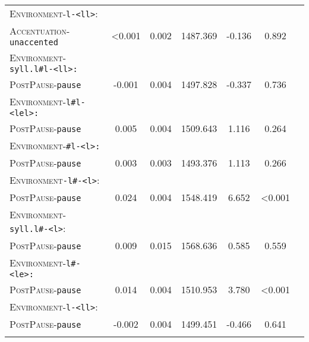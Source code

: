\begin{table}[H]
{\begin{tabular}{lSSSSSS}
		\textsc{Environment}-\texttt{l-<ll>}:&&&&&\\
		\textsc{Accentuation}-\texttt{unaccented} & \color{lsLightGray} <0.001 &\color{lsLightGray}  0.002 & \color{lsLightGray} 1487.369 &\color{lsLightGray}  -0.136 & \color{lsLightGray} 0.892 \\ 
		
		\textsc{Environment}-\texttt{syll.l\#l-<ll>:}&&&&&\\
		\textsc{PostPause}-\texttt{pause} &\color{lsLightGray}  -0.001 &\color{lsLightGray}  0.004 & \color{lsLightGray} 1497.828 &\color{lsLightGray}  -0.337 & \color{lsLightGray} 0.736 \\ 
		
		\textsc{Environment}-\texttt{l\#l-<lel>:}&&&&&\\
		\textsc{PostPause}-\texttt{pause} &\color{lsLightGray}  0.005 &\color{lsLightGray}  0.004 &\color{lsLightGray} 1509.643 & \color{lsLightGray} 1.116 &\color{lsLightGray}  0.264 \\ 
		
		\textsc{Environment}-\texttt{\#l-<l>:}&&&&&\\
		\textsc{PostPause}-\texttt{pause} & \color{lsLightGray} 0.003 &\color{lsLightGray}  0.003 & \color{lsLightGray} 1493.376 &\color{lsLightGray}  1.113 & \color{lsLightGray} 0.266 \\ 
		
		\textsc{Environment}\texttt{-l\#-<l>}:&&&&&\\
		\textsc{PostPause}-\texttt{pause} & 0.024 & 0.004 & 1548.419 & 6.652 &  <0.001 \\ 
		
		\textsc{Environment}-\texttt{syll.l\#-<l>}:&&&&&\\
		\textsc{PostPause}-\texttt{pause} &\color{lsLightGray}  0.009 &\color{lsLightGray}  0.015 & \color{lsLightGray} 1568.636 &\color{lsLightGray}  0.585 & \color{lsLightGray} 0.559 \\ 
		
		\textsc{Environment}-\texttt{l\#-<le>:}&&&&&\\
		\textsc{PostPause}-\texttt{pause} & 0.014 & 0.004 & 1510.953 & 3.780 &  <0.001 \\
		
		\textsc{Environment}-\texttt{l-<ll>}:&&&&&\\
		\textsc{PostPause}-\texttt{pause} & \color{lsLightGray} -0.002 & \color{lsLightGray} 0.004 & \color{lsLightGray} 1499.451 &\color{lsLightGray}  -0.466 & \color{lsLightGray} 0.641 \\ 
	\lspbottomrule 
			\end{tabular}}
\end{table}


